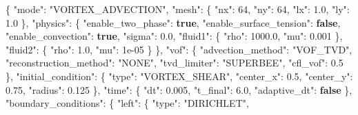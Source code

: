 \documentclass[
  10pt,
]{article}
\newenvironment{Shaded}{}{}
\newcommand{\DataTypeTok}[1]{\textcolor[rgb]{0.56,0.13,0.00}{#1}}
\newcommand{\DecValTok}[1]{\textcolor[rgb]{0.25,0.63,0.44}{#1}}
\newcommand{\FloatTok}[1]{\textcolor[rgb]{0.25,0.63,0.44}{#1}}
\newcommand{\FunctionTok}[1]{\textcolor[rgb]{0.02,0.16,0.49}{#1}}
\newcommand{\KeywordTok}[1]{\textcolor[rgb]{0.00,0.44,0.13}{\textbf{#1}}}
\newcommand{\StringTok}[1]{\textcolor[rgb]{0.25,0.44,0.63}{#1}}
\begin{document}
\begin{Shaded}
\begin{Highlighting}[]
\FunctionTok{\{}
  \DataTypeTok{"mode"}\FunctionTok{:} \StringTok{"VORTEX\_ADVECTION"}\FunctionTok{,}
  \DataTypeTok{"mesh"}\FunctionTok{:} \FunctionTok{\{}
    \DataTypeTok{"nx"}\FunctionTok{:} \DecValTok{64}\FunctionTok{,}
    \DataTypeTok{"ny"}\FunctionTok{:} \DecValTok{64}\FunctionTok{,}
    \DataTypeTok{"lx"}\FunctionTok{:} \FloatTok{1.0}\FunctionTok{,}
    \DataTypeTok{"ly"}\FunctionTok{:} \FloatTok{1.0}
  \FunctionTok{\},}
  \DataTypeTok{"physics"}\FunctionTok{:} \FunctionTok{\{}
    \DataTypeTok{"enable\_two\_phase"}\FunctionTok{:} \KeywordTok{true}\FunctionTok{,}
    \DataTypeTok{"enable\_surface\_tension"}\FunctionTok{:} \KeywordTok{false}\FunctionTok{,}
    \DataTypeTok{"enable\_convection"}\FunctionTok{:} \KeywordTok{true}\FunctionTok{,}
    \DataTypeTok{"sigma"}\FunctionTok{:} \FloatTok{0.0}\FunctionTok{,}
    \DataTypeTok{"fluid1"}\FunctionTok{:} \FunctionTok{\{}
      \DataTypeTok{"rho"}\FunctionTok{:} \FloatTok{1000.0}\FunctionTok{,}
      \DataTypeTok{"mu"}\FunctionTok{:} \FloatTok{0.001}
    \FunctionTok{\},}
    \DataTypeTok{"fluid2"}\FunctionTok{:} \FunctionTok{\{}
      \DataTypeTok{"rho"}\FunctionTok{:} \FloatTok{1.0}\FunctionTok{,}
      \DataTypeTok{"mu"}\FunctionTok{:} \DecValTok{1e{-}05}
    \FunctionTok{\}}
  \FunctionTok{\},}
  \DataTypeTok{"vof"}\FunctionTok{:} \FunctionTok{\{}
    \DataTypeTok{"advection\_method"}\FunctionTok{:} \StringTok{"VOF\_TVD"}\FunctionTok{,}
    \DataTypeTok{"reconstruction\_method"}\FunctionTok{:} \StringTok{"NONE"}\FunctionTok{,}
    \DataTypeTok{"tvd\_limiter"}\FunctionTok{:} \StringTok{"SUPERBEE"}\FunctionTok{,}
    \DataTypeTok{"cfl\_vof"}\FunctionTok{:} \FloatTok{0.5}
  \FunctionTok{\},}
  \DataTypeTok{"initial\_condition"}\FunctionTok{:} \FunctionTok{\{}
    \DataTypeTok{"type"}\FunctionTok{:} \StringTok{"VORTEX\_SHEAR"}\FunctionTok{,}
    \DataTypeTok{"center\_x"}\FunctionTok{:} \FloatTok{0.5}\FunctionTok{,}
    \DataTypeTok{"center\_y"}\FunctionTok{:} \FloatTok{0.75}\FunctionTok{,}
    \DataTypeTok{"radius"}\FunctionTok{:} \FloatTok{0.125}
  \FunctionTok{\},}
  \DataTypeTok{"time"}\FunctionTok{:} \FunctionTok{\{}
    \DataTypeTok{"dt"}\FunctionTok{:} \FloatTok{0.005}\FunctionTok{,}
    \DataTypeTok{"t\_final"}\FunctionTok{:} \FloatTok{6.0}\FunctionTok{,}
    \DataTypeTok{"adaptive\_dt"}\FunctionTok{:} \KeywordTok{false}
  \FunctionTok{\},}
  \DataTypeTok{"boundary\_conditions"}\FunctionTok{:} \FunctionTok{\{}
    \DataTypeTok{"left"}\FunctionTok{:} \FunctionTok{\{}
      \DataTypeTok{"type"}\FunctionTok{:} \StringTok{"DIRICHLET"}\FunctionTok{,}

\end{Highlighting}
\end{Shaded}
\end{document}
